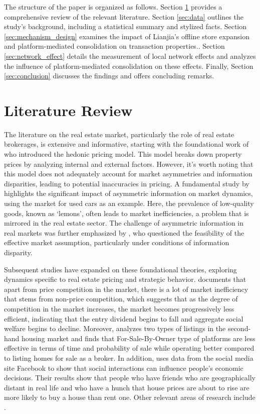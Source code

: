 \documentclass[11pt]{article}
\begin{document}
The structure of the paper is organized as follows. Section \ref{sec:literature_review} provides a comprehensive review of the relevant literature. Section \ref{sec:data} outlines the study's background, including a statistical summary and stylized facts. Section \ref{sec:mechanism_design} examines the impact of Lianjia's offline store expansion and platform-mediated consolidation on transaction properties.. Section \ref{sec:network_effect} details the measurement of local network effects and analyzes the influence of platform-mediated consolidation on these effects. Finally, Section \ref{sec:conclusion} discusses the findings and offers concluding remarks.

\section{Literature Review} \label{sec:literature_review}

The literature on the real estate market, particularly the role of real estate brokerages, is extensive and informative, starting with the foundational work of \citep{Rosen_hedonic} who introduced the hedonic pricing model. This model breaks down property prices by analyzing internal and external factors. However, it's worth noting that this model does not adequately account for market asymmetries and information disparities, leading to potential inaccuracies in pricing. A fundamental study by \citep{Akerlof_1970} highlights the significant impact of asymmetric information on market dynamics, using the market for used cars as an example. Here, the prevalence of low-quality goods, known as `lemons', often leads to market inefficiencies, a problem that is mirrored in the real estate sector. The challenge of asymmetric information in real markets was further emphasized by \citet{grossman_impossibility_1980}, who questioned the feasibility of the effective market assumption, particularly under conditions of information disparity. 

Subsequent studies have expanded on these foundational theories, exploring dynamics specific to real estate pricing and strategic behavior. \citet{550a6ccf-cde2-3dd1-979f-1a8db2b8ceb9} documents that apart from price competition in the market, there is a lot of market inefficiency that stems from non-price competition, which suggests that as the degree of competition in the market increases, the market becomes progressively less efficient, indicating that the entry dividend begins to fall and aggregate social welfare begins to decline. Moreover, \citet{hendel_relative_2009} analyzes two types of listings in the second-hand housing market and finds that For-Sale-By-Owner type of platforms are less effective in terms of time and probability of sale while operating better compared to listing homes for sale as a broker. In addition, \citet{bailey_economic_2018} uses data from the social media site Facebook to show that social interactions can influence people's economic decisions. Their results show that people who have friends who are geographically distant in real life and who have a hunch that house prices are about to rise are more likely to buy a house than rent one. Other relevant areas of research include \citep{SIRMANS1991207, NIEUWERBURGH_information, salz_intermediation_2022}.
\end{document}
